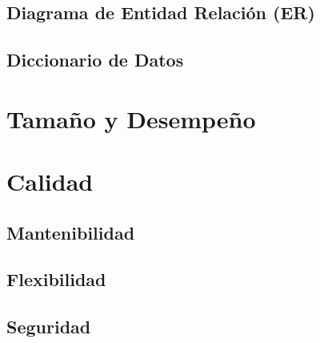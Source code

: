 \documentclass{article}
\begin{document}
    \subsection{Diagrama de Entidad Relación (ER)}
    \subsection{Diccionario de Datos}


    \section{Tamaño y Desempeño} \label{tamDesemp}

    \section{Calidad}
    \subsection{Mantenibilidad}
    \subsection{Flexibilidad}
    \subsection{Seguridad}
\end{document}
